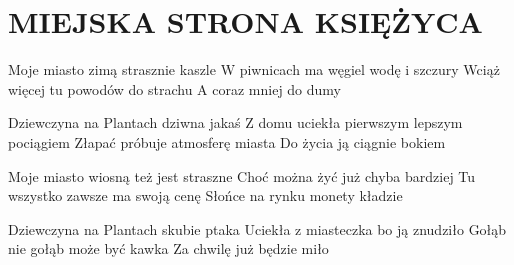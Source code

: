 \documentclass[../../../songbook.tex]{subfiles}
\begin{document}
\TabPositions{9cm} %
\section*{MIEJSKA STRONA KSIĘŻYCA}
{}
\vspace{0.5cm}
Moje miasto zimą strasznie kaszle			  \newline	
W piwnicach ma węgiel wodę i szczury		  \newline	
Wciąż więcej tu powodów do strachu		 \newline	
A coraz mniej do dumy				   \newline	

\-\hspace{1cm} Dziewczyna na Plantach dziwna jakaś		 \newline	
\-\hspace{1cm} Z domu uciekła pierwszym lepszym pociągiem	 \newline	
\-\hspace{1cm} Złapać próbuje atmosferę miasta			 \newline	
\-\hspace{1cm} Do życia ją ciągnie bokiem				  \newline	

Moje miasto wiosną też jest straszne \newline
Choć można żyć już chyba bardziej \newline
Tu wszystko zawsze ma swoją cenę \newline
Słońce na rynku monety kładzie \newline

\-\hspace{1cm} Dziewczyna na Plantach skubie ptaka \newline
\-\hspace{1cm} Uciekła z miasteczka bo ją znudziło \newline
\-\hspace{1cm} Gołąb nie gołąb może być kawka \newline
\-\hspace{1cm} Za chwilę już będzie miło \newline
\end{document}
